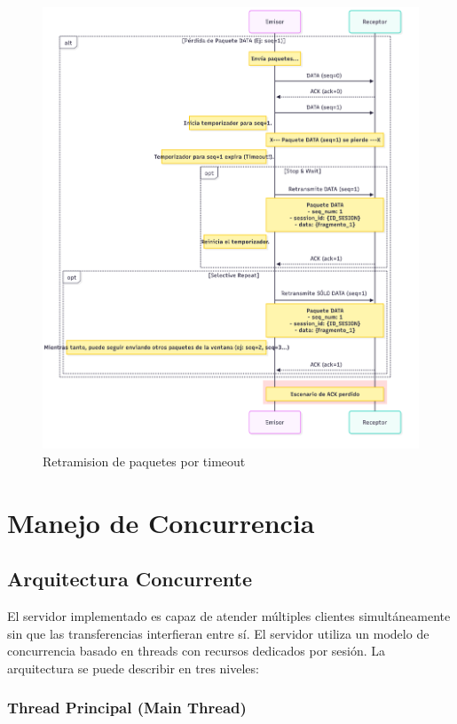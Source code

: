 \begin{figure}[H]
    \centering
    \includegraphics[width=1\linewidth]{images/RETRANSMISION}
    \caption{Retramision de paquetes por timeout}
    \label{fig:retransmision}
\end{figure}





\section{Manejo de Concurrencia}

\subsection{Arquitectura Concurrente}
El servidor implementado es capaz de atender múltiples clientes simultáneamente sin que las transferencias interfieran entre sí.
El servidor utiliza un modelo de concurrencia basado en threads con recursos dedicados por sesión. La arquitectura se puede describir en tres niveles:

\subsubsection{Thread Principal (Main Thread)}


